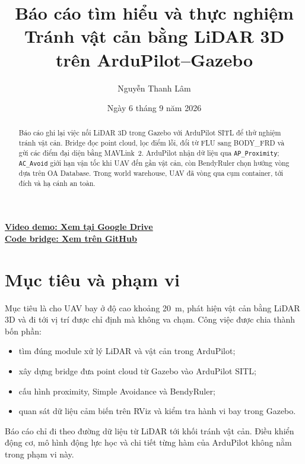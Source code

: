 \documentclass[11pt,a4paper]{article}
\title{Báo cáo tìm hiểu và thực nghiệm\\
Tránh vật cản bằng LiDAR 3D trên ArduPilot--Gazebo}
\author{Nguyễn Thanh Lâm}
\date{Ngày 6 tháng 9 năm 2026}
\begin{document}
\maketitle
\vspace{-1.2em}
\begin{center}
\small
\href{https://drive.google.com/file/d/1zR5dzNd2X10FpFaAOa5IzSibcBF2wXll/view}{\textcolor{demogreen}{\underline{\textbf{Video demo: Xem tại Google Drive}}}}\\[3pt]
\href{https://github.com/thanhlamauto/ardu_plugin_gazebo/blob/3411b9a/scripts/lidar_to_mavlink_avoidance.py}{\textcolor{demogreen}{\underline{\textbf{Code bridge: Xem trên GitHub}}}}
\end{center}
\vspace{0.4em}

\begin{abstract}
Báo cáo ghi lại việc nối LiDAR 3D trong Gazebo với ArduPilot SITL để thử nghiệm tránh vật cản. Bridge đọc point cloud, lọc điểm lỗi, đổi từ FLU sang BODY\_FRD và gửi các điểm đại diện bằng MAVLink~2. ArduPilot nhận dữ liệu qua \texttt{AP\_Proximity}; \texttt{AC\_Avoid} giới hạn vận tốc khi UAV đến gần vật cản, còn BendyRuler chọn hướng vòng dựa trên OA Database. Trong world warehouse, UAV đã vòng qua cụm container, tới đích và hạ cánh an toàn.
\end{abstract}

\section{Mục tiêu và phạm vi}

Mục tiêu là cho UAV bay ở độ cao khoảng 20~m, phát hiện vật cản bằng LiDAR 3D và đi tới vị trí được chỉ định mà không va chạm. Công việc được chia thành bốn phần:

\begin{itemize}
  \item tìm đúng module xử lý LiDAR và vật cản trong ArduPilot;
  \item xây dựng bridge đưa point cloud từ Gazebo vào ArduPilot SITL;
  \item cấu hình proximity, Simple Avoidance và BendyRuler;
  \item quan sát dữ liệu cảm biến trên RViz và kiểm tra hành vi bay trong Gazebo.
\end{itemize}

Báo cáo chỉ đi theo đường dữ liệu từ LiDAR tới khối tránh vật cản. Điều khiển động cơ, mô hình động lực học và chi tiết từng hàm của ArduPilot không nằm trong phạm vi này.
\end{document}
